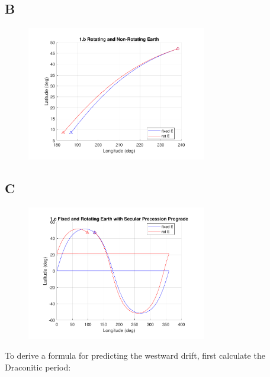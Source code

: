 \documentclass[conf]{new-aiaa}
\begin{document}
\subsection*{B}

\begin{figure}[H]
	\centering 
	\includegraphics*[width=0.7\textwidth]{1.b Rotating and Non-Rotating Earth.pdf}
	\label{fig:1.a}
\end{figure}


\subsection*{C}

\begin{figure}[H]
	\centering 
	\includegraphics*[width=0.7\textwidth]{1.c Fixed and Rotating Earth with Secular Precession Prograde.pdf}
	\label{fig:1.a}
\end{figure}

To derive a formula for predicting the westward drift, first calculate the Draconitic period: 
\end{document}
